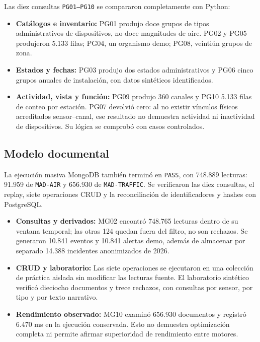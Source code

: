 \documentclass[12pt,letterpaper]{article}
\begin{document}
Las diez consultas \texttt{PG01--PG10} se compararon completamente con Python:
\begin{itemize}
    \item \textbf{Catálogos e inventario:} PG01 produjo doce grupos de tipos
    administrativos de dispositivos, no doce magnitudes de aire. PG02 y PG05
    produjeron 5.133 filas; PG04, un organismo demo; PG08, veintiún grupos de zona.
    \item \textbf{Estados y fechas:} PG03 produjo dos estados administrativos
    y PG06 cinco grupos anuales de instalación, con datos sintéticos identificados.
    \item \textbf{Actividad, vista y función:} PG09 produjo 360 canales y PG10
    5.133 filas de conteo por estación. PG07 devolvió cero: al no existir vínculos
    físicos acreditados sensor--canal, ese resultado no demuestra actividad ni
    inactividad de dispositivos. Su lógica se comprobó con casos controlados.
\end{itemize}

\subsection{Modelo documental}
La ejecución masiva MongoDB también terminó en \texttt{PASS}, con 748.889 lecturas:
91.959 de \texttt{MAD-AIR} y 656.930 de \texttt{MAD-TRAFFIC}. Se verificaron las
diez consultas, el replay, siete operaciones CRUD y la reconciliación de
identificadores y hashes con PostgreSQL.

\begin{itemize}
    \item \textbf{Consultas y derivados:} MG02 encontró 748.765 lecturas dentro
    de su ventana temporal; las otras 124 quedan fuera del filtro, no son rechazos.
    Se generaron 10.841 eventos y 10.841 alertas demo, además de almacenar por
    separado 14.388 incidentes anonimizados de 2026.
    \item \textbf{CRUD y laboratorio:} Las siete operaciones se ejecutaron en
    una colección de práctica aislada sin modificar las lecturas fuente.
    El laboratorio sintético verificó dieciocho documentos y trece rechazos,
    con consultas por sensor, por tipo y por texto narrativo.
    \item \textbf{Rendimiento observado:} MG10 examinó 656.930 documentos y
    registró 6.470 ms en la ejecución conservada. Esto no demuestra optimización
    completa ni permite afirmar superioridad de rendimiento entre motores.
\end{itemize}
\end{document}

